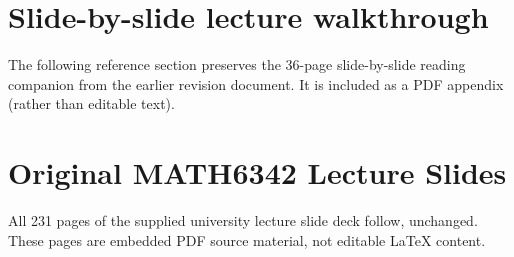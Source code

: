\documentclass[11pt,a4paper]{article}
\begin{document}
\clearpage\section*{Slide-by-slide lecture walkthrough}
The following reference section preserves the 36-page slide-by-slide reading companion from the earlier revision document. It is included as a PDF appendix (rather than editable text).

\clearpage\section*{Original MATH6342 Lecture Slides}
All 231 pages of the supplied university lecture slide deck follow, unchanged. These pages are embedded PDF source material, not editable LaTeX content.

\end{document}
